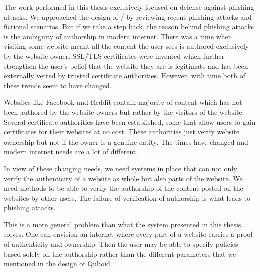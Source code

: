 The work performed in this thesis exclusively focused on defense against phishing attacks. We approached the design of \namesecureworkstation/ by reviewing recent phishing attacks and fictional scenarios. But if we take a step back, the reason behind phishing attacks is the ambiguity of authorship in modern internet. There was a time when visiting some website meant all the content the user sees is authored exclusively by the website owner. SSL/TLS certificates were invented which further strengthen the user's belief that the website they are is legitimate and has been externally vetted by trusted certificate authorities. However, with time both of these trends seem to have changed.

Websites like Facebook and Reddit contain majority of content which has not been authored by the website owners but rather by the visitors of the website. Several certificate authorities have been established, some that allow users to gain certificates for their websites at no cost. These authorities just verify website ownership but not if the owner is a genuine entity. The times have changed and modern internet needs are a lot of different.

In view of these changing needs, we need systems in place that can not only verify the authenticity of a website as whole but also parts of the website. We need methods to be able to verify the authorship of the content posted on the websites by other users. The failure of verification of authorship is what leads to phishing attacks.

This is a more general problem than what the system presented in this thesis solves. One can envision an internet where every part of a website carries a proof of authenticity and ownership. Then the user may be able to specify policies based solely on the authorship rather than the different parameters that we mentioned in the design of Quboid.
